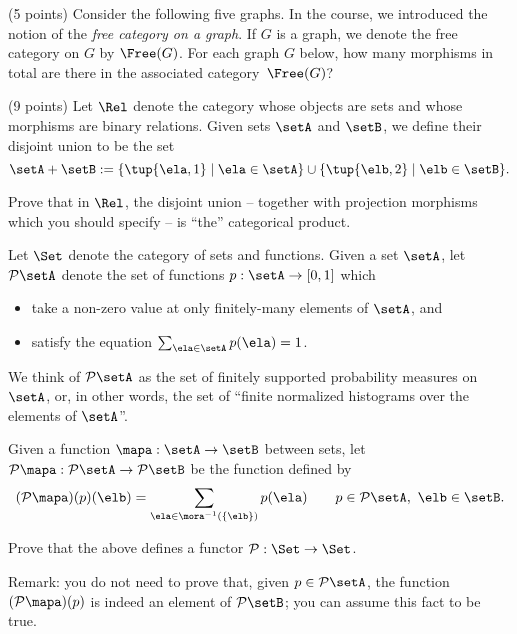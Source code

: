 \documentclass[paper=8.125in:10.250in,pagesize=pdftex,
    headinclude=false,footinclude=false,oneside,egregdoesnotlikesansseriftitles]{kaobook}
\begin{document}

\newpage

\begin{gradedexercise}\label{ex:FreeCatOnGraph}
(5 points) Consider the following five graphs. In the course, we introduced the notion of the \emph{free category on a graph}. If $G$ is a graph, we denote the free category on $G$ by $\Free(G)$. For each graph $G$ below, how many morphisms in total are there in the associated category~$\Free(G)$?

  \begin{center}
  \end{center}
\end{gradedexercise}


\newpage


\begin{gradedexercise}\label{ex:DirectSumProd}
(9 points) Let $\Rel$ denote the category whose objects are sets and whose morphisms are binary relations. Given sets $\setA$ and $\setB$, we define their disjoint union to be the set
$$
\setA + \setB := \{ \tup{\ela, 1} \mid \ela \in \setA \} \cup \{ \tup{\elb, 2} \mid \elb \in \setB \}.
$$

Prove that in $\Rel$, the disjoint union -- together with projection morphisms which you should specify -- is ``the'' categorical product. 
\end{gradedexercise}


\newpage


\begin{gradedexercise}\label{ex:ProbFunc}
Let $\Set$ denote the category of sets and functions. 
Given a set $\setA$, let $\mathcal{P} \setA$ denote the set of functions $p: \setA \to [0,1]$ which 
\begin{itemize}
\item take a non-zero value at only finitely-many elements of $\setA$, and 
\item satisfy the equation $\sum_{\ela \in \setA} p(\ela) = 1$. 
\end{itemize}
We think of $\mathcal{P} \setA$ as the set of finitely supported probability measures on $\setA$, or, in other words, the set of ``finite normalized histograms over the elements of $\setA$''. 

Given a function $\mapa: \setA \to \setB$ between sets, let $\mathcal{P} \mapa: \mathcal{P}\setA \to \mathcal{P}\setB$ be the function defined by 
$$ (\mathcal{P} \mapa)(p)(\elb) = \sum_{\ela \in \mora^{-1}(\{ \elb \})} p(\ela) \quad \quad  p \in \mathcal{P}\setA, \  \elb \in \setB.$$

Prove that the above defines a functor $\mathcal{P}: \Set \to \Set$. 

Remark: you do not need to prove that, given $p \in \mathcal{P}\setA$, the function $(\mathcal{P} \mapa)(p)$ is indeed an element of $\mathcal{P}\setB$; you can assume this fact to be true. 
\end{gradedexercise}
\end{document}
